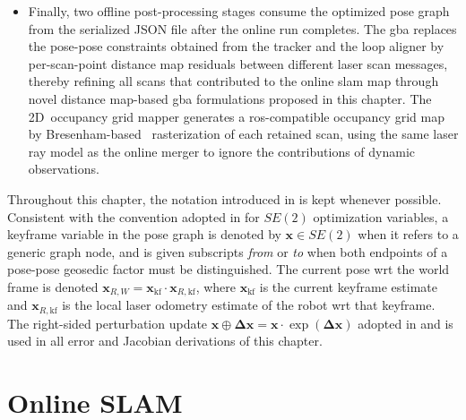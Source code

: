 \begin{itemize}
\item Finally, two offline post-processing stages consume the optimized pose
      graph from the serialized JSON file after the online run completes.
      The \gls{gba} replaces the pose-pose constraints obtained from
      the tracker and the loop aligner by per-scan-point distance map residuals
      between different laser scan messages, thereby refining all scans that
      contributed to the online \gls{slam} map through novel distance map-based
      \gls{gba} formulations proposed in this chapter.
      The 2D~occupancy grid mapper generates a \gls{ros}-compatible occupancy grid map
      by Bresenham-based~\cite{bresenham:ibm:1965,zingl:uas:2016} rasterization
      of each retained scan, using the same laser ray model as
      the online merger to ignore the contributions of dynamic observations.
\end{itemize}

Throughout this chapter, the notation introduced in
 is kept whenever possible.
Consistent with the convention adopted in 
for $SE(2)$ optimization variables, a keyframe variable in the pose graph
is denoted by $\mathbf{x} \in SE(2)$ when it refers to a generic graph node,
and is given subscripts \emph{from} or \emph{to} when both endpoints of
a pose-pose geosedic factor must be distinguished.
The current pose \gls{wrt} the world frame is denoted
$\mathbf{x}_{R,W} = \mathbf{x}_{\mathrm{kf}} \cdot \mathbf{x}_{R,\mathrm{kf}}$,
where $\mathbf{x}_{\mathrm{kf}}$ is the current keyframe estimate and
$\mathbf{x}_{R,\mathrm{kf}}$ is the local laser odometry estimate of
the robot \gls{wrt} that keyframe. The right-sided perturbation update
$\mathbf{x} \oplus \mathbf{\Delta x} = \mathbf{x}\cdot\exp(\mathbf{\Delta x})$
adopted in
 and
 is used in all error and
Jacobian derivations of this chapter.

\section{Online SLAM}\label{sec:slam:online}


